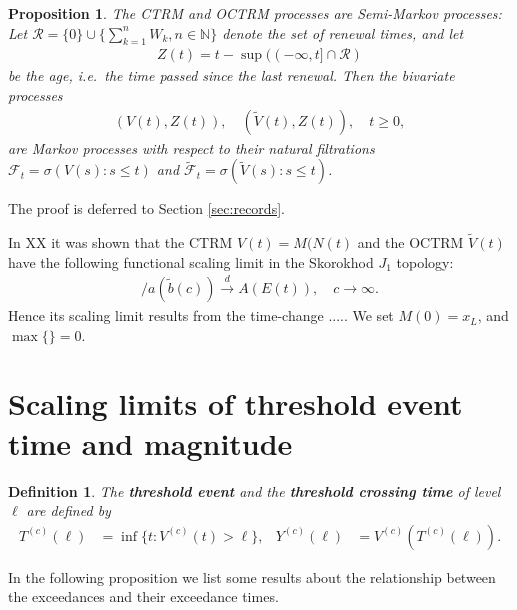 \documentclass[12pt]{article}
\newtheorem{proposition}[equation]{Proposition}
\newtheorem{definition}[equation]{Definition}
\newcommand{\1}{\mathbf 1}
\begin{document}
\begin{proposition}
The CTRM and OCTRM processes are Semi-Markov processes: 
Let $\mathcal R = \{0\} \cup \{\sum_{k=1}^n W_k, n \in \mathbb N\}$ denote the set of renewal times, and let 
\begin{align*}
Z(t) = t - \sup((-\infty, t] \cap \mathcal R)
\end{align*}
be the \emph{age}, i.e.\ the time passed since the last renewal. Then the bivariate processes 
\begin{align*}
(V(t), Z(t)), \quad (\tilde V(t), Z(t)), \quad t \ge 0,
\end{align*}
are Markov processes with respect to their natural filtrations $\mathcal F_t = \sigma(V(s): s \le t)$ and $\tilde{\mathcal F}_t = \sigma(\tilde V(s): s \le t)$. 
\end{proposition}

The proof is deferred to Section \ref{sec:records}.

In XX it was shown that the CTRM $V(t) = M(N(t)$ and the OCTRM $\tilde V(t)$ have the following functional scaling limit in the Skorokhod $J_1$ topology: 
\begin{align*}
[V(ct) - d(\tilde b(c))] / a(\tilde b(c)) \stackrel{d}{\to} 
A(E(t)), \quad c \to \infty.
\end{align*}
Hence its scaling limit results from the time-change .....
We set $M(0) = x_L$, and $\max\{\} = 0$. 



\section{Scaling limits of threshold event time and magnitude}

\begin{definition}
The \textbf{threshold event} and the \textbf{threshold crossing time} 
of level $\ell$ are defined by
\begin{align*}
T^{(c)}(\ell) &= \inf\{t: V^{(c)}(t) > \ell\}, 
&
Y^{(c)}(\ell) &= V^{(c)}(T^{(c)}(\ell)).
\end{align*}
\end{definition}

In the following proposition we list some results about the relationship between the exceedances and their exceedance times.
\end{document}
